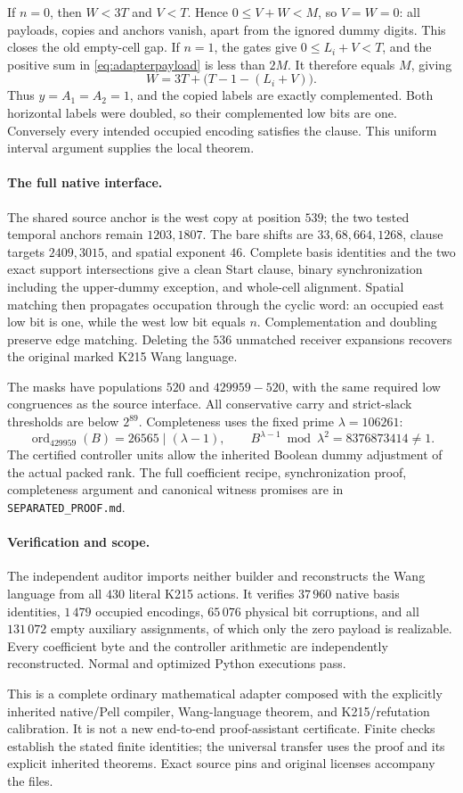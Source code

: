 If \(n=0\), then \(W<3T\) and \(V<T\). Hence \(0\le V+W<M\),
so \(V=W=0\): all payloads, copies and anchors vanish, apart from the
ignored dummy digits. This closes the old empty-cell gap.
If \(n=1\), the gates give \(0\le L_i+V<T\), and the positive sum in
\eqref{eq:adapterpayload} is less than \(2M\). It therefore equals \(M\), giving
\[
 W=3T+\bigl(T-1-(L_i+V)\bigr).
\]
Thus \(y=A_1=A_2=1\), and the copied labels are exactly complemented.
Both horizontal labels were doubled, so their complemented low bits
are one. Conversely every intended occupied encoding satisfies the
clause. This uniform interval argument supplies the local theorem.

\paragraph{The full native interface.}
The shared source anchor is the west copy at position \(539\);
the two tested temporal anchors remain \(1203,1807\). The bare shifts
are \(33,68,664,1268\), clause targets \(2409,3015\), and spatial
exponent \(46\). Complete basis identities and the two exact support
intersections give a clean Start clause, binary synchronization
including the upper-dummy exception, and whole-cell alignment.
Spatial matching then propagates occupation through the cyclic word:
an occupied east low bit is one, while the west low bit equals \(n\).
Complementation and doubling preserve edge matching. Deleting the
\(536\) unmatched receiver expansions recovers the original marked
K215 Wang language.

The masks have populations \(520\) and \(429959-520\), with the same
required low congruences as the source interface. All conservative
carry and strict-slack thresholds are below \(2^{89}\).
Completeness uses the fixed prime \(\lambda=106261\):
\[
 \operatorname{ord}_{429959}(B)=26565\mid(\lambda-1),
 \qquad B^{\lambda-1}\bmod\lambda^2=8376873414\ne1.
\]
The certified controller units allow the inherited Boolean dummy
adjustment of the actual packed rank. The full coefficient recipe,
synchronization proof, completeness argument and canonical witness
promises are in \texttt{SEPARATED\_PROOF.md}.

\paragraph{Verification and scope.}
The independent auditor imports neither builder and reconstructs the
Wang language from all \(430\) literal K215 actions. It verifies \(37\,960\) native basis
identities, \(1\,479\) occupied encodings, \(65\,076\) physical bit
corruptions, and all \(131\,072\) empty auxiliary assignments, of which
only the zero payload is realizable. Every coefficient byte and the
controller arithmetic are independently reconstructed. Normal and
optimized Python executions pass.

This is a complete ordinary mathematical adapter composed with the
explicitly inherited native/Pell compiler, Wang-language theorem, and
K215/refutation calibration. It is not a new end-to-end proof-assistant
certificate. Finite checks establish the stated finite identities;
the universal transfer uses the proof and its explicit inherited
theorems. Exact source pins and original licenses accompany the files.
